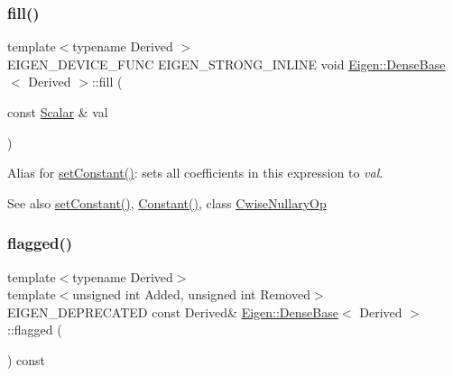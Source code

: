 \subsubsection{\texorpdfstring{fill()}{fill()}}
{\footnotesize\ttfamily template$<$typename Derived $>$ \\
E\+I\+G\+E\+N\+\_\+\+D\+E\+V\+I\+C\+E\+\_\+\+F\+U\+NC E\+I\+G\+E\+N\+\_\+\+S\+T\+R\+O\+N\+G\+\_\+\+I\+N\+L\+I\+NE void \mbox{\hyperlink{class_eigen_1_1_dense_base}{Eigen\+::\+Dense\+Base}}$<$ Derived $>$\+::fill (\begin{DoxyParamCaption}\item[{const \mbox{\hyperlink{class_eigen_1_1_dense_base_a5feed465b3a8e60c47e73ecce83e39a2}{Scalar}} \&}]{val }\end{DoxyParamCaption})}

Alias for \mbox{\hyperlink{class_eigen_1_1_dense_base_a19b2bc788277e9ab3f967a8857e290ae}{set\+Constant()}}\+: sets all coefficients in this expression to {\itshape val}.

\begin{DoxySeeAlso}{See also}
\mbox{\hyperlink{class_eigen_1_1_dense_base_a19b2bc788277e9ab3f967a8857e290ae}{set\+Constant()}}, \mbox{\hyperlink{class_eigen_1_1_dense_base_ab0ae1bfa72faedcaf53af81ca76c446b}{Constant()}}, class \mbox{\hyperlink{class_eigen_1_1_cwise_nullary_op}{Cwise\+Nullary\+Op}} 
\end{DoxySeeAlso}
\mbox{\label{class_eigen_1_1_dense_base_a9b3f75f76ae40439be870258e80c7346}} 
\subsubsection{\texorpdfstring{flagged()}{flagged()}}
{\footnotesize\ttfamily template$<$typename Derived$>$ \\
template$<$unsigned int Added, unsigned int Removed$>$ \\
E\+I\+G\+E\+N\+\_\+\+D\+E\+P\+R\+E\+C\+A\+T\+ED const Derived\& \mbox{\hyperlink{class_eigen_1_1_dense_base}{Eigen\+::\+Dense\+Base}}$<$ Derived $>$\+::flagged (\begin{DoxyParamCaption}{ }\end{DoxyParamCaption}) const\hspace{0.3cm}{\ttfamily [inline]}}

